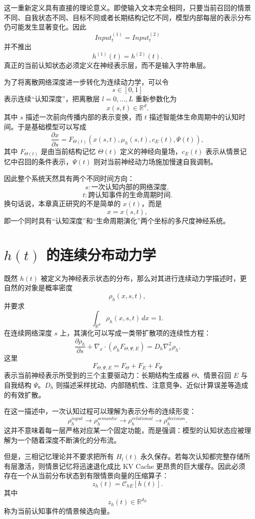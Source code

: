 这一重新定义具有直接的理论意义。即使输入文本完全相同，只要当前召回的情景不同、自我状态不同、目标不同或者长期结构记忆不同，模型内部每层的表示分布仍可能发生显著变化。因此
\[
Input_t^{(1)}=Input_t^{(2)}
\]
并不推出
\[
h^{(1)}(t)=h^{(2)}(t).
\]
真正的当前认知状态必须定义在神经表示层，而不是输入字符串层。

为了将离散网络深度进一步转化为连续动力学，可以令
\[
s\in[0,1]
\]
表示连续“认知深度”，把离散层 $l=0,\ldots,L$ 重新参数化为
\[
x(s,t)\in\mathbb{R}^{d}.
\]
其中 $s$ 描述一次前向传播内部的表示变换，而 $t$ 描述智能体生命周期中的认知时间。于是基础模型可以写成
\[
\frac{\partial x}{\partial s}
=
F_{\Theta(t)}
\left(
x(s,t),
\mu_h(s,t),
c_E(t),
\Psi(t)
\right),
\]
其中 $F_{\Theta(t)}$ 是由当前结构记忆 $\Theta(t)$ 定义的神经向量场，$c_E(t)$ 表示从情景记忆中召回的条件表示，$\Psi(t)$ 则对当前神经动力场施加慢速自我调制。

因此整个系统天然具有两个不同时间方向：
\[
s:
\text{一次认知内部的网络深度},
\]
\[
t:
\text{跨认知事件的生命周期时间}.
\]
换句话说，本章真正研究的不是简单的 $x(t)$，而是
\[
\boxed{
x=x(s,t),
}
\]
即一个同时具有“认知深度”和“生命周期演化”两个坐标的多尺度神经系统。

\section{$h(t)$ 的连续分布动力学}

既然 $h(t)$ 被定义为神经表示状态的分布，那么对其进行连续动力学描述时，更自然的对象是概率密度
\[
\rho_h(x,s,t),
\]
并要求
\[
\int_{\mathbb{R}^{d}}
\rho_h(x,s,t)\,dx
=
1.
\]
在连续网络深度 $s$ 上，其演化可以写成一类带扩散项的连续性方程：
\[
\frac{\partial \rho_h}{\partial s}
+
\nabla_x\cdot
\left(
\rho_h F_{\Theta,\Psi,E}
\right)
=
D_h\nabla_x^2\rho_h.
\]
这里
\[
F_{\Theta,\Psi,E}
=
F_\Theta
+
F_E
+
F_\Psi
\]
表示当前神经表示所受到的三个主要驱动力：长期结构生成器 $\Theta$、情景召回 $E$ 与自我结构 $\Psi$。$D_h$ 则描述采样扰动、内部随机性、注意竞争、近似计算误差等造成的有效扩散。

在这一描述中，一次认知过程可以理解为表示分布的连续形变：
\[
\rho_h^{input}
\rightarrow
\rho_h^{semantic}
\rightarrow
\rho_h^{relational}
\rightarrow
\rho_h^{decision}.
\]
这并不意味着每一层严格对应某一个固定功能，而是强调：模型的认知状态应被理解为一个随着深度不断演化的分布流。

但是，三相记忆理论并不要求把所有 $H_l(t)$ 永久保存。若每次认知都完整存储所有层激活，则情景记忆将迅速退化成比 KV Cache 更昂贵的巨大缓存。因此必须存在一个从当前分布状态到有限情景向量的压缩算子：
\[
z_h(t)
=
\mathcal{C}_{hE}
\left[
h(t)
\right].
\]
其中
\[
z_h(t)\in\mathbb{R}^{d_E}
\]
称为当前认知事件的情景候选向量。

